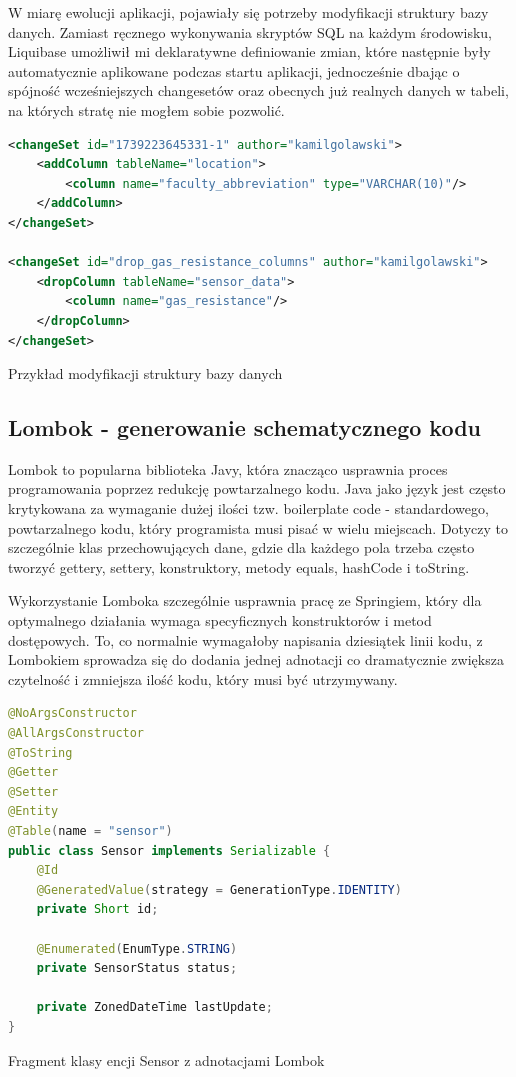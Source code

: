 \documentclass[a4paper,12pt,openany]{book}
\begin{document}
W miarę ewolucji aplikacji, pojawiały się potrzeby modyfikacji struktury bazy danych. Zamiast ręcznego wykonywania skryptów SQL na każdym środowisku, Liquibase umożliwił mi deklaratywne definiowanie zmian, które następnie były automatycznie aplikowane podczas startu aplikacji, jednocześnie dbając o spójność wcześniejszych changesetów oraz obecnych już realnych danych w tabeli, na których stratę nie mogłem sobie pozwolić.

\begin{lstfloat}[htbp]
\begin{lstlisting}[language=xml]
<changeSet id="1739223645331-1" author="kamilgolawski">
    <addColumn tableName="location">
        <column name="faculty_abbreviation" type="VARCHAR(10)"/>
    </addColumn>
</changeSet>

<changeSet id="drop_gas_resistance_columns" author="kamilgolawski">
    <dropColumn tableName="sensor_data">
        <column name="gas_resistance"/>
    </dropColumn>
</changeSet>
\end{lstlisting}
\caption{Przykład modyfikacji struktury bazy danych}
\label{lst:liquibase-modify}
\end{lstfloat}

\vspace{2cm}

\subsection*{Lombok - generowanie schematycznego kodu}

Lombok to popularna biblioteka Javy, która znacząco usprawnia proces programowania poprzez redukcję powtarzalnego kodu. Java jako język jest często krytykowana za wymaganie dużej ilości tzw. boilerplate code - standardowego, powtarzalnego kodu, który programista musi pisać w wielu miejscach. Dotyczy to szczególnie klas przechowujących dane, gdzie dla każdego pola trzeba często tworzyć gettery, settery, konstruktory, metody equals, hashCode i toString.

Wykorzystanie Lomboka szczególnie usprawnia pracę ze Springiem, który dla optymalnego działania wymaga specyficznych konstruktorów i metod dostępowych. To, co normalnie wymagałoby napisania dziesiątek linii kodu, z Lombokiem sprowadza się do dodania jednej adnotacji co dramatycznie zwiększa czytelność i zmniejsza ilość kodu, który musi być utrzymywany.

\begin{lstfloat}[htbp]
\begin{lstlisting}[language=java]
@NoArgsConstructor
@AllArgsConstructor
@ToString
@Getter
@Setter
@Entity
@Table(name = "sensor")
public class Sensor implements Serializable {
    @Id
    @GeneratedValue(strategy = GenerationType.IDENTITY)
    private Short id;

    @Enumerated(EnumType.STRING)
    private SensorStatus status;

    private ZonedDateTime lastUpdate;
}
\end{lstlisting}
\caption{Fragment klasy encji Sensor z adnotacjami Lombok}
\label{lst:lombok}
\end{lstfloat}
\end{document}
